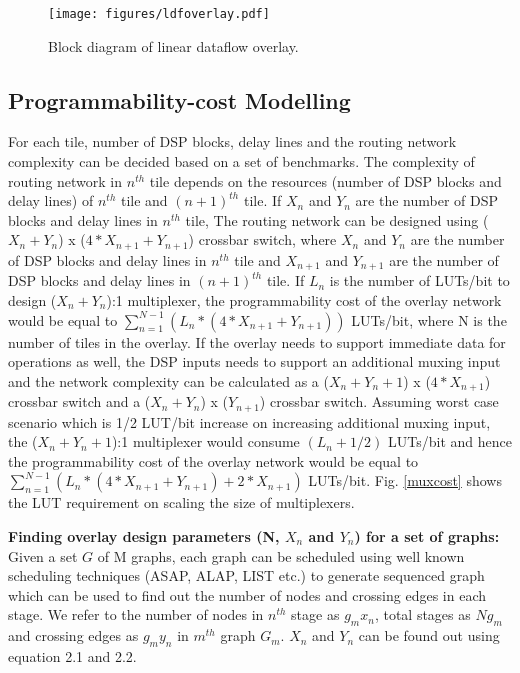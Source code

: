 \begin{figure}[!h]
	\centering
	\texttt{[image: figures/ldfoverlay.pdf]}
	\caption{Block diagram of linear dataflow overlay.}
	\label{ldfblk}
\end{figure}

\subsection{Programmability-cost Modelling }
For each tile, number of DSP blocks, delay lines and the routing network complexity can be decided based on a set of benchmarks.
The complexity of routing network in $n^{th}$ tile depends on the resources (number of DSP blocks and delay lines) of $n^{th}$ tile and $(n+1)^{th}$ tile.
If $X_{n}$ and $Y_{n}$ are the number of DSP blocks and delay lines in $n^{th}$ tile, 
The routing network can be designed using ($X_{n}+Y_{n}$) x ($4*X_{n+1}+Y_{n+1}$) crossbar switch, where $X_{n}$ and $Y_{n}$ are the number of DSP blocks and delay lines in $n^{th}$ tile and $X_{n+1}$ and $Y_{n+1}$ are the number of DSP blocks and delay lines in $(n+1)^{th}$ tile.
If $L_{n}$ is the number of LUTs/bit to design ($X_{n}+Y_{n}$):1 multiplexer, the programmability cost of the overlay network would be equal to $\displaystyle\sum_{n=1}^{N-1} (L_{n}*(4*X_{n+1}+Y_{n+1}))$ LUTs/bit, where N is the number of tiles in the overlay.
If the overlay needs to support immediate data for operations as well, the DSP inputs needs to support an additional muxing input and the network complexity can be calculated as a ($X_{n}+Y_{n}+1$) x ($4*X_{n+1}$) crossbar switch and a ($X_{n}+Y_{n}$) x ($Y_{n+1}$) crossbar switch. Assuming worst case scenario which is 1/2 LUT/bit increase on increasing additional muxing input, the ($X_{n}+Y_{n}+1$):1 multiplexer would consume $(L_{n}+1/2)$ LUTs/bit and hence the programmability cost of the overlay network would be equal to $\displaystyle\sum_{n=1}^{N-1} (L_{n}*(4*X_{n+1}+Y_{n+1}) + 2*X_{n+1})$ LUTs/bit.
Fig. \ref{muxcost} shows the LUT requirement on scaling the size of multiplexers.



\textbf{Finding overlay design parameters (N, $X_{n}$ and $Y_{n}$) for a set of graphs:}
Given a set $G$ of M graphs, each graph can be scheduled using well known scheduling techniques (ASAP, ALAP, LIST etc.) to generate sequenced graph which can be used to find out the number of nodes and crossing edges in each stage. We refer to the number of nodes in $n^{th}$ stage as $g_{m}x_{n}$, total stages as $Ng_{m}$ and crossing edges as $g_{m}y_{n}$ in $m^{th}$ graph $G_{m}$.
$X_{n}$ and $Y_{n}$ can be found out using equation 2.1 and 2.2.

